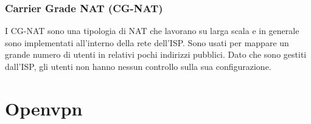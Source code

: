 \subsubsection{Carrier Grade NAT (CG-NAT) \ok}
\label{subsubsec:cg-nat}

I CG-NAT \cite{Carrier-grade_NAT} sono una tipologia di NAT che lavorano su larga scala e in generale sono implementati all'interno della rete dell'ISP. Sono usati per mappare un grande numero di utenti in relativi pochi indirizzi pubblici.
Dato che sono gestiti dall'ISP, gli utenti non hanno nessun controllo sulla sua configurazione.


\section{Openvpn \ok}

